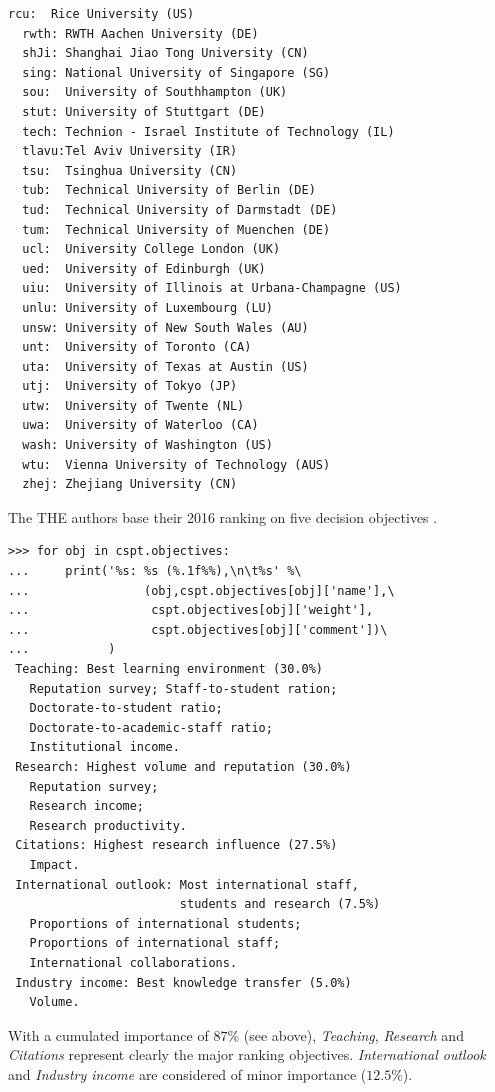 \begin{lstlisting}[caption={Printing the CS Departments},label=list:13.2,basicstyle=\ttfamily\scriptsize]
  rcu:	Rice University (US)
  rwth:	RWTH Aachen University (DE)
  shJi:	Shanghai Jiao Tong University (CN)
  sing:	National University of Singapore (SG)
  sou:	University of Southhampton (UK)
  stut:	University of Stuttgart (DE)
  tech:	Technion - Israel Institute of Technology (IL)
  tlavu:Tel Aviv University (IR)
  tsu:	Tsinghua University (CN)
  tub:	Technical University of Berlin (DE)
  tud:	Technical University of Darmstadt (DE)
  tum:	Technical University of Muenchen (DE)
  ucl:	University College London (UK)
  ued:	University of Edinburgh (UK)
  uiu:	University of Illinois at Urbana-Champagne (US)
  unlu:	University of Luxembourg (LU)
  unsw:	University of New South Wales (AU)
  unt:	University of Toronto (CA)
  uta:	University of Texas at Austin (US)
  utj:	University of Tokyo (JP)
  utw:	University of Twente (NL)
  uwa:	University of Waterloo (CA)
  wash:	University of Washington (US)
  wtu:	Vienna University of Technology (AUS)
  zhej:	Zhejiang University (CN)
\end{lstlisting}

The THE authors base their 2016 ranking on five decision objectives \citep{THE-2016}.
\begin{lstlisting}[caption={The THE ranking objectives},label=list:13.3,basicstyle=\ttfamily\scriptsize]
>>> for obj in cspt.objectives:
...     print('%s: %s (%.1f%%),\n\t%s' %\
...                (obj,cspt.objectives[obj]['name'],\
...                 cspt.objectives[obj]['weight'],
...                 cspt.objectives[obj]['comment'])\
...           ) 
 Teaching: Best learning environment (30.0%)
   Reputation survey; Staff-to-student ration;
   Doctorate-to-student ratio;
   Doctorate-to-academic-staff ratio;
   Institutional income.
 Research: Highest volume and reputation (30.0%)
   Reputation survey;
   Research income;
   Research productivity.
 Citations: Highest research influence (27.5%)
   Impact.
 International outlook: Most international staff,
                        students and research (7.5%)
   Proportions of international students;
   Proportions of international staff;
   International collaborations.
 Industry income: Best knowledge transfer (5.0%)
   Volume.
\end{lstlisting}

With a cumulated importance of $87\%$ (see above), \emph{Teaching}, \emph{Research} and \emph{Citations} represent clearly the major ranking objectives. \emph{International outlook} and \emph{Industry income} are considered of minor importance ($12.5\%$).

